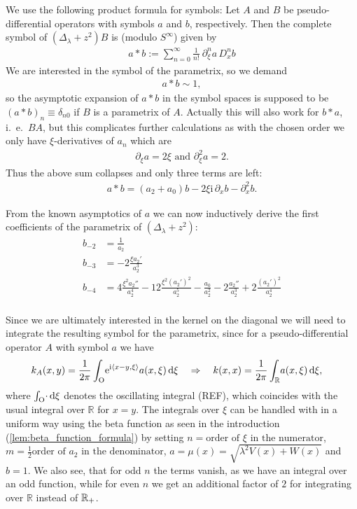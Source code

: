 We use the following product formula for symbols: Let $A$ and $B$ be
pseudo-differential operators with symbols $a$ and $b$, respectively. Then the
complete symbol of $(\Delta_\lambda + z^2)B$ is (modulo $S^\infty$) given by
\begin{align}
  a * b := \sum_{n=0}^{\infty} \frac{1}{n!}\ \partial_\xi^n a\,D_x^n b
  \label{eqn:product-formula}
\end{align}
We are interested in the symbol of the parametrix, so we demand
\begin{align*}
  a * b \sim 1,
\end{align*}
so the asymptotic expansion of $a * b$ in the symbol spaces is supposed to be
$(a * b)_n \equiv \delta_{n0}$ if $B$ is a parametrix of $A$. Actually this will
also work for $b * a$, i.~e.\ $BA$, but this complicates further calculations as
with the chosen order we only have $\xi$-derivatives of $a_n$ which are
\begin{align}
  \partial_{\xi} a = 2\xi \text{ and } \partial_{\xi}^2 a = 2.
\end{align}
Thus the above sum collapses and only three terms are left:
\begin{align}
  a * b = (a_2 + a_0)b - 2\xi\mathrm i\,\partial_x b - \partial_x^2 b.
\end{align}

From the known asymptotics of $a$ we can now inductively derive the first
coefficients of the parametrix of $(\Delta_\lambda + z^2)$:
\begin{align*}
  b_{-2} &= \frac{1}{a_2} \\
  b_{-3} &= -2\frac{\xi a_2'}{a_2^3}\\
  b_{-4} &= 4\frac{\xi^2 a_2''}{a_2^4}
  - 12\frac{\xi^2 (a_2')^2}{a_2^5} - \frac{a_0}{a_2^2}
  - 2\frac{a_2''}{a_2^3} + 2\frac{(a_2')^2}{a_2^4} \\
  \label{eqn:coeff-symbol}
\end{align*}

Since we are ultimately interested in the kernel on the diagonal we will need to
integrate the resulting symbol for the parametrix, since for a
pseudo-differential operator $A$ with symbol $a$ we have
\begin{align*}
  k_A(x,y) &= \frac{1}{2\pi}\int_{\mathrm O}^{}\!
    \mathrm e^{\mathrm i\left\langle x-y, \xi\right\rangle} a(x,\xi)
  \,\mathrm d{\xi}
  \quad
  \Rightarrow
  \quad
  k(x,x) = \frac{1}{2\pi}\int_{\mathbb{R}}^{}\!a(x,\xi)\,\mathrm d{\xi},
\end{align*}
where $\int_{\mathrm O}^{}\!\cdot\,\mathrm d{\xi}$ denotes the oscillating integral (REF), which
coincides with the usual integral over $\mathbb{R}$ for $x = y$. The integrals
over $\xi$ can be handled with in a uniform way using the beta function as seen
in the introduction (\ref{lem:beta_function_formula}) by setting $n =
\text{order of $\xi$ in the numerator}$, $m = \tfrac12\text{order of $a_2$ in
the denominator}$, $a=\mu(x)=\sqrt{\lambda^2 V(x) + W(x)}$ and $b = 1$. We also
see, that for odd $n$ the terms vanish, as we have an integral over an odd
function, while for even $n$ we get an additional factor of $2$ for integrating
over $\mathbb{R}$ instead of ${\mathbb{R}_+}$.

